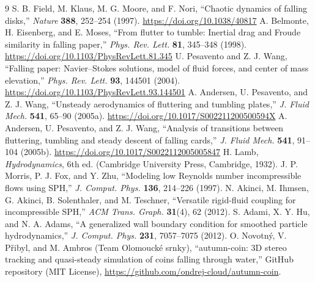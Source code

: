 \documentclass[10pt,a4paper,twocolumn]{article}
\begin{document}
\begin{thebibliography}{9}
 S. B. Field, M. Klaus, M. G. Moore, and F. Nori, ``Chaotic dynamics of falling disks,'' \textit{Nature} \textbf{388}, 252--254 (1997). \url{https://doi.org/10.1038/40817}
 A. Belmonte, H. Eisenberg, and E. Moses, ``From flutter to tumble: Inertial drag and Froude similarity in falling paper,'' \textit{Phys. Rev. Lett.} \textbf{81}, 345--348 (1998). \url{https://doi.org/10.1103/PhysRevLett.81.345}
 U. Pesavento and Z. J. Wang, ``Falling paper: Navier--Stokes solutions, model of fluid forces, and center of mass elevation,'' \textit{Phys. Rev. Lett.} \textbf{93}, 144501 (2004). \url{https://doi.org/10.1103/PhysRevLett.93.144501}
 A. Andersen, U. Pesavento, and Z. J. Wang, ``Unsteady aerodynamics of fluttering and tumbling plates,'' \textit{J. Fluid Mech.} \textbf{541}, 65--90 (2005a). \url{https://doi.org/10.1017/S002211200500594X}
 A. Andersen, U. Pesavento, and Z. J. Wang, ``Analysis of transitions between fluttering, tumbling and steady descent of falling cards,'' \textit{J. Fluid Mech.} \textbf{541}, 91--104 (2005b). \url{https://doi.org/10.1017/S0022112005005847}
 H. Lamb, \textit{Hydrodynamics}, 6th ed. (Cambridge University Press, Cambridge, 1932).
 J. P. Morris, P. J. Fox, and Y. Zhu, ``Modeling low Reynolds number incompressible flows using SPH,'' \textit{J. Comput. Phys.} \textbf{136}, 214--226 (1997).
 N. Akinci, M. Ihmsen, G. Akinci, B. Solenthaler, and M. Teschner, ``Versatile rigid-fluid coupling for incompressible SPH,'' \textit{ACM Trans. Graph.} \textbf{31}(4), 62 (2012).
 S. Adami, X. Y. Hu, and N. A. Adams, ``A generalized wall boundary condition for smoothed particle hydrodynamics,'' \textit{J. Comput. Phys.} \textbf{231}, 7057--7075 (2012).
 O. Novotn\'y, V. P\v{r}ibyl, and M. Ambros (Team Olomouck\'e srnky), ``autumn-coin: 3D stereo tracking and quasi-steady simulation of coins falling through water,'' GitHub repository (MIT License), \url{https://github.com/ondrej-cloud/autumn-coin}.
\end{thebibliography}
\end{document}
